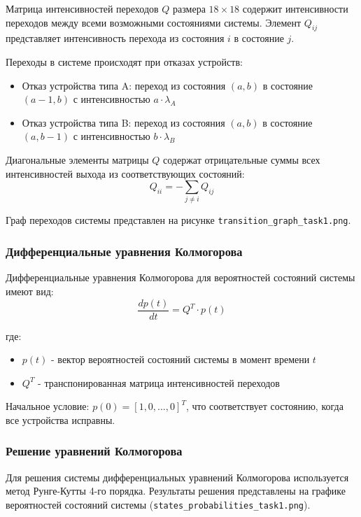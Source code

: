 Матрица интенсивностей переходов $Q$ размера $18 \times 18$ содержит интенсивности переходов между всеми возможными состояниями системы. Элемент $Q_{ij}$ представляет интенсивность перехода из состояния $i$ в состояние $j$.

Переходы в системе происходят при отказах устройств:
\begin{itemize}
    \item Отказ устройства типа A: переход из состояния $(a, b)$ в состояние $(a-1, b)$ с интенсивностью $a \cdot \lambda_A$
    \item Отказ устройства типа B: переход из состояния $(a, b)$ в состояние $(a, b-1)$ с интенсивностью $b \cdot \lambda_B$
\end{itemize}

Диагональные элементы матрицы $Q$ содержат отрицательные суммы всех интенсивностей выхода из соответствующих состояний:
\begin{equation}
Q_{ii} = -\sum_{j \neq i} Q_{ij}
\end{equation}

Граф переходов системы представлен на рисунке \texttt{transition\_graph\_task1.png}.

\subsubsection{Дифференциальные уравнения Колмогорова}

Дифференциальные уравнения Колмогорова для вероятностей состояний системы имеют вид:
\begin{equation}
\frac{dp(t)}{dt} = Q^T \cdot p(t)
\end{equation}

где:
\begin{itemize}
    \item $p(t)$ - вектор вероятностей состояний системы в момент времени $t$
    \item $Q^T$ - транспонированная матрица интенсивностей переходов
\end{itemize}

Начальное условие: $p(0) = [1, 0, \ldots, 0]^T$, что соответствует состоянию, когда все устройства исправны.

\subsubsection{Решение уравнений Колмогорова}

Для решения системы дифференциальных уравнений Колмогорова используется метод Рунге-Кутты 4-го порядка. Результаты решения представлены на графике вероятностей состояний системы (\texttt{states\_probabilities\_task1.png}).

